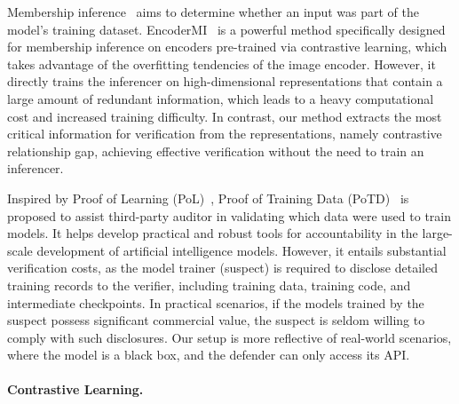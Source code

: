 Membership inference~\cite{shokri2017membership,choquette2021label,carlini2022membership,hu2022membership} aims to determine whether an input was part of the model's training dataset. EncoderMI~\cite{liu2021encodermi} is a powerful method specifically designed for membership inference on encoders pre-trained via contrastive learning, which takes advantage of the overfitting tendencies of the image encoder. However, it directly trains the inferencer on high-dimensional representations that contain a large amount of redundant information, which leads to a heavy computational cost and increased training difficulty. In contrast, our method extracts the most critical information for verification from the representations, namely contrastive relationship gap, achieving effective verification without the need to train an inferencer. 


Inspired by Proof of Learning (PoL)~\cite{jia2021proof,fang2023proof,zhao2024proof}, Proof of Training Data (PoTD)~\cite{choi2024tools} is proposed to assist third-party auditor in validating which data were used to train models. It helps develop practical and robust tools for accountability in the large-scale development of artificial intelligence models. However, it entails substantial verification costs, as the model trainer (suspect) is required to disclose detailed training records to the verifier, including training data, training code, and intermediate checkpoints. In practical scenarios, if the models trained by the suspect possess significant commercial value, the suspect is seldom willing to comply with such disclosures. Our setup is more reflective of real-world scenarios, where the model is a black box, and the defender can only access its API. 


\paragraph{Contrastive Learning.}


